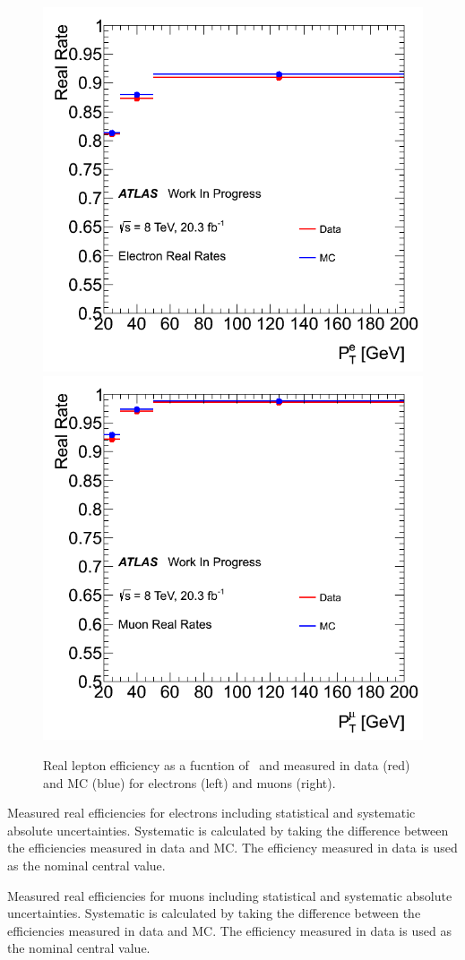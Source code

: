 \begin{figure}[h!]
\centering
\includegraphics[width=0.45\columnwidth]{figures/fakes_bkg/Efficiencies/ElectronRealRates.png}
\includegraphics[width=0.45\columnwidth]{figures/fakes_bkg/Efficiencies/MuonRealRates.png}
\caption{Real lepton efficiency as a fucntion of \pt\ and measured in data (red) and MC (blue) for electrons (left) and muons (right).}
\label{fig:realEff}
\end{figure}

\clearpage

\begin{table}[h!]
\centering

\caption{Measured real efficiencies for electrons including statistical and systematic absolute uncertainties. 
Systematic is calculated by taking the difference
between the efficiencies measured in data and MC.  The efficiency measured in data is used as the nominal central value.
} 
\label{table:realEff_El}
\end{table} 

\begin{table}[h!]
\centering

\caption{Measured real efficiencies for muons including statistical and systematic absolute uncertainties.
Systematic is calculated by taking the difference
between the efficiencies measured in data and MC.  The efficiency measured in data is used as the nominal central value.
} 
\label{table:realEff_Mu}
\end{table} 


